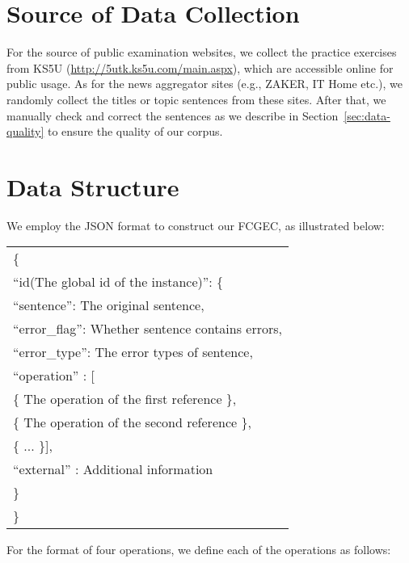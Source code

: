 \documentclass[11pt]{article}
\begin{document}
\appendix

\clearpage
\appendix

\section{Source of Data Collection}
\label{appendix:source}

For the source of public examination websites, we collect the practice exercises from KS5U (\url{http://5utk.ks5u.com/main.aspx}), which are accessible online for public usage. As for the news aggregator sites (e.g., ZAKER, IT Home etc.), we randomly collect the titles or topic sentences from these sites. After that, we manually check and correct the sentences as we describe in Section~\ref{sec:data-quality} to ensure the quality of our corpus.

\section{Data Structure}
\label{appendix:structure}

We employ the JSON format to construct our FCGEC, as illustrated below:
\begin{tcolorbox}[colback=white,colframe=black,arc=1mm, auto outer arc,
                  boxrule=0.5pt,
                  left=5pt,
                  top=1pt,
                  bottom=1pt
                  ]
                  
    \begin{tabular}[c]{@{}l@{}}
    \small \{ \\
    \small \quad ``id(The global id of the instance)'': \{ \\
    \small \quad \quad``sentence'': The original sentence, \\
    \small \quad \quad``error\_flag'':  Whether sentence contains errors, \\
    \small \quad \quad``error\_type'': The error types of sentence, \\  
    \small \quad \quad``operation'' : [ \\
    \small \quad \quad \quad\{ The operation of the first reference \}, \\
    \small \quad \quad \quad\{ The operation of the second reference \}, \\
    \small \quad \quad \quad\{ ... \}], \\
    \small \quad \quad``external'' : Additional information \\
    \small \quad\} \\
    \small \}
	\end{tabular}
\end{tcolorbox} 
For the format of four operations, we define each of the operations as follows:
\end{document}
